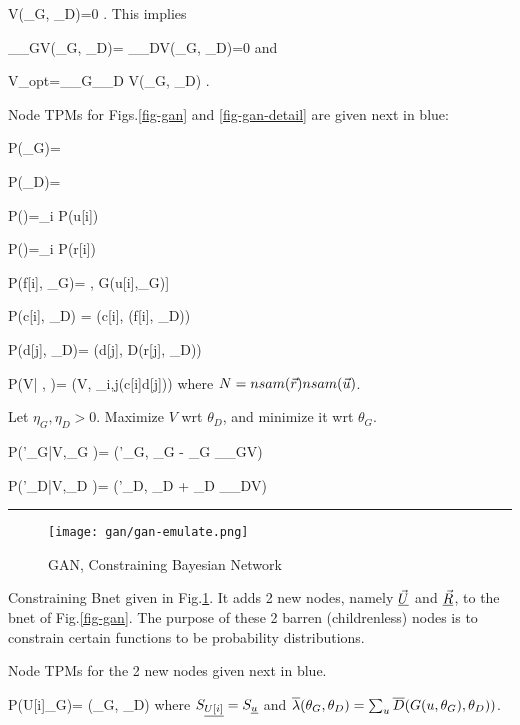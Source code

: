 \beq
\delta V(\theta_G, \theta_D)=0
\;.
\eeq
This implies

\beq
 \partial_{\theta_G}V(\theta_G, \theta_D)=
 \partial_{\theta_D}V(\theta_G, \theta_D)=0
\;
\eeq
and

\beq
V_{opt}=\min_{\theta_G}\max_{\theta_D} V(\theta_G, \theta_D)
\;.
\eeq

Node TPMs
for Figs.\ref{fig-gan} and \ref{fig-gan-detail} 
are
given next in blue:

\beq\color{blue}
P(\theta_G)=
\eeq

\beq\color{blue}
P(\theta_D)=
\eeq


\beq\color{blue}
P(\vecu)=\prod_i P(u[i])  \;
\eeq

\beq\color{blue}
P(\vecr)=\prod_i P(r[i])
\eeq


\beq\color{blue}
P(f[i]\cond \vecu, \theta_G)= \delta[f[i], G(u[i],\theta_G)]
\eeq

\beq\color{blue}
P(c[i]\cond \vecf, \theta_D) = \delta(c[i], (f[i], \theta_D))
\eeq

\beq\color{blue}
P(d[j]\cond \vecr, \theta_D)= \delta(d[j], D(r[j], \theta_D))
\eeq




\beq\color{blue}
P(V| \vecd,  \vecc)=
\delta(V, \ln \prod_{i,j}(c[i]d[j]))
\eeq
where $N=nsam({\vec{r}})nsam({\vec{u}})$.


Let $\eta_G, \eta_D> 0$. Maximize $V$ wrt $\theta_D$, and
minimize it wrt $\theta_G$.

\beq\color{blue}
P(\theta'_G|V,\theta_G )=
\delta(\theta'_G, \theta_G - \eta_G 
\partial_{\theta_G}V)
\eeq

\beq\color{blue}
P(\theta'_D|V,\theta_D )=
\delta(\theta'_D, \theta_D + \eta_D 
\partial_{\theta_D}V)
\eeq

\hrule
\begin{figure}[h!]
\centering
\texttt{[image: gan/gan-emulate.png]}
\caption{GAN, Constraining Bayesian Network}
\label{fig-gan-emulate} 
\end{figure}

Constraining Bnet given in Fig.\ref{fig-gan-emulate}. It adds 2 new nodes, namely $\underline{\vec{U}}$ and $\underline{\vec{R}}$, to  the bnet of Fig.\ref{fig-gan}. The purpose of these 2  barren (childrenless) nodes is to constrain certain functions to be probability distributions.

Node TPMs for the 2 new nodes given next in blue.


\beq\color{blue}
P(U[i]\cond \theta_G)= 
{\ol{\lam}(\theta_G, \theta_D)}
\eeq
where  $S_{\underline{U[i]}}=S_{\underline{u}}$ and $\overline{\lambda}(\theta_G, \theta_D)=\sum_u\overline{D}(G(u, \theta_G), \theta_D))$.

